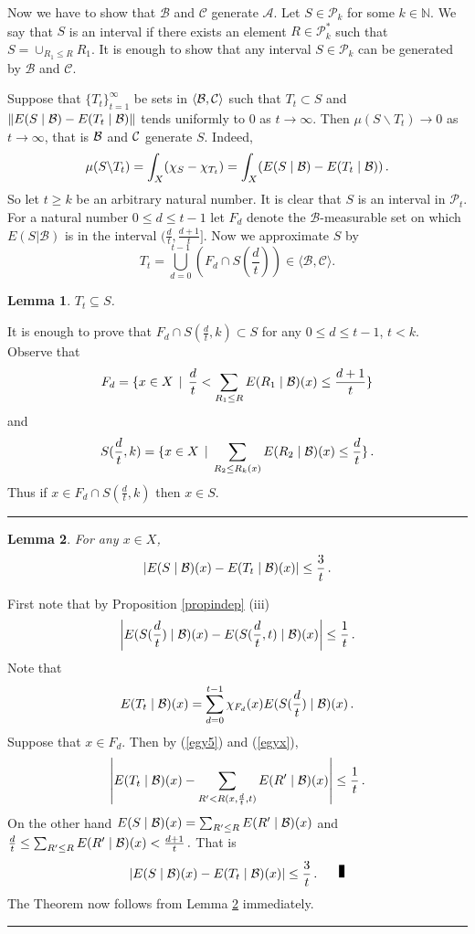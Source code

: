 \documentclass [11pt] {article}
\newcommand{\qed} {\hspace {0.1in} \rule {1.5mm} {3.5mm}}
\newtheorem{lemma}{Lemma}[section]
\def\proof{\smallskip\noindent{\it Proof.} }
\def\cB{\mbox{$\cal B$}}
\def\cC{\mbox{$\cal C$}}
\def\cB{\mbox{$\cal B$}}
\def\cC{\mbox{$\cal C$}}
\def\to{\rightarrow}
\begin{document}
\noindent
Now we have to show that $\mathcal{B}$ and $\mathcal{C}$ generate
$\mathcal{A}$. Let $S\in\mathcal{P}_k$  for some
$k\in\mathbb{N}$. We say that $S$ is an interval if there exists an element
$R\in\mathcal{P}_k^*$ such that $S=\cup_{R_1\leq R}R_1$.  It is enough to show
that any interval $S\in\mathcal{P}_k$ can be generated by $\mathcal{B}$ and
$\mathcal{C}$.

\noindent
Suppose that $\{T_t\}^\infty_{t=1}$ be sets in $\langle\cB,\cC\rangle$
such that $T_t\subset S$ and
$\|E(S\mid \cB)-E(T_t\mid \cB)\|$ tends uniformly to $0$
as $t\to\infty$. Then $\mu(S \backslash T_t)\to 0$
as $t\to \infty$, that is $\cB$ and $\cC$ generate $S$.
Indeed,
$$\mu(S\backslash T_t)=\int_X(\chi_S- \chi_{T_t})=\int_X(E(S\mid \cB)- 
E(T_t\mid \cB))\,.$$
So let $t\geq k$ be an arbitrary natural number. It is clear that
$S$ is an interval in $\mathcal{P}_t$. For a natural number $0\leq d\leq t-1$
let $F_d$ denote the $\mathcal{B}$-measurable set on which $E(S|\mathcal{B})$
is in the interval $(\frac{d}{t},\frac{d+1}{t}]$. Now we approximate $S$ by
$$T_t=\bigcup_{d=0}^{t-1}(F_d\cap S(\frac{d}{t}))\in
\langle\mathcal{B},\mathcal{C}\rangle.$$
\begin{lemma} \label{lemma63}
$T_t\subseteq S$.
\end{lemma}
\proof
It is enough to prove that $F_d\cap S(\frac{d}{t},k)\subset S$ for any
$0\leq d \leq t-1$, $t<k$.
Observe that
$$F_d=\{x\in X\,\mid\, \frac{d}{t}<
\sum_{R_1\leq R} E(R_1\mid \cB)(x)\leq \frac{d+1}{t}\}$$
and
$$S(\frac{d}{t},k)=\{x\in X\,\mid\, \sum_{R_2\leq R_k(x)} E(R_2\mid
\cB)(x)\leq \frac{d}{t}\}\,.$$
Thus if $x\in F_d\cap S(\frac{d}{t},k)$ then $x\in S$.\qed
\begin{lemma} \label{lemma64} For any $x\in X$,
$$\left|E(S\mid \cB)(x)-E(T_t\mid \cB)(x)\right|\leq \frac{3}{t}\,.$$
\end{lemma}
\proof
First note that by Proposition \ref{propindep} (iii)
\begin{equation}\label{egyx}
\left|E(S(\frac{d}{t})\mid \cB)(x)- E(S(\frac{d}{t},t)\mid \cB)(x)\right|\leq
\frac{1}{t}\,.
\end{equation}
Note that
$$E(T_t\mid \cB)(x)=\sum^{t-1}_{d=0} \chi_{F_d}(x)
E(S(\frac{d}{t})\mid\cB)(x)\,.$$
Suppose that $x\in F_d$. Then by (\ref{egy5}) and (\ref{egyx}),
$$\left|E(T_t\mid \cB)(x)-\sum_{R'<R(x,\frac{d}{t},t)}
E(R'\mid \cB)(x)\right|\leq
\frac{1}{t}\,. $$
On the other hand
$E(S\mid\cB)(x)=\sum_{R'\leq R} E(R'\mid \cB)(x)$ and
$\frac{d}{t}\leq \sum_{R'\leq R} E(R'\mid \cB)(x) < \frac{d+1}{t}\,.$
That is
$$\left|E(S\mid \cB)(x)-E(T_t\mid \cB)(x)\right|\leq \frac{3}{t}
\,.\quad \qed $$
The Theorem now follows from Lemma \ref{lemma64} immediately. \qed
\end{document}
